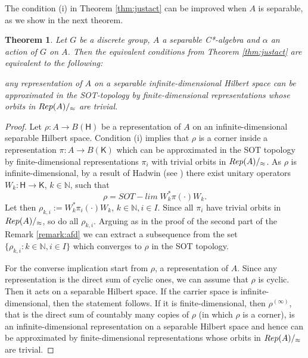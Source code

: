 \documentclass[11 pt, leqno, hidelinks]{amsart}%
\newtheorem{theorem}{Theorem}[section]
\theoremstyle{plain}
\numberwithin{equation}{section}
\newcommand{\N}{\mathbb{N}}
\newcommand{\Rep}{\textup{Rep}}
\newcommand{\Hil}{\mathsf{H}}
\newcommand{\Kil}{\mathsf{K}}
\begin{document}

The condition (i) in Theorem \ref{thm:justact} can be improved when $A$ is separable, as we show in the next theorem.

\begin{theorem}\label{thm:justactseparable}
	Let $G$ be a discrete  group, $A$ a separable C*-algebra and $\alpha$ an action of $G$ on $A$.  Then the equivalent conditions from Theorem \ref{thm:justact}  are equivalent to the following:

\medskip

 any  representation of $A$  on a separable infinite-dimensional Hilbert space can be approximated in the SOT-topology by finite-dimensional representations whose orbits in $\Rep(A)/_\approx$ are trivial.

\end{theorem}
\begin{proof}
		Let $\rho:A \to B(\Hil)$ be a representation of $A$ on an infinite-dimensional  separable Hilbert space. Condition (i)  implies that $\rho$ is a corner inside a representation $\pi:A \to B(\Kil)$ which can be approximated in the SOT topology by finite-dimensional representations $\pi_i$ with trivial orbits in $\Rep(A)/_\approx$.
	As $\rho$ is infinite-dimensional, by a result of Hadwin (see \cite[Lemma 2.4]{CS}) there exist unitary operators $W_k:\Hil \to \Kil$, $k \in \N$, such that
	$$\rho = SOT-lim \; W_k^*\pi (\cdot)W_k.$$
	Let then $\rho_{k,i}:=W_k^* \pi_i(\cdot) W_k$, $k \in \N, i \in I$. Since all $\pi_i$ have trivial orbits in $\Rep(A)/_\approx$, so do all $\rho_{k,i}$.
	Arguing as in the proof of the second part of the Remark \ref{remark:afd} we can extract a subsequence from the set $\{\rho_{k,i}: k \in \N, i \in I\}$ which converges to $\rho$ in the SOT topology.	
	
For the converse implication start from $\rho$, a representation of $A$. Since any representation is the direct sum of cyclic ones, we can assume that $\rho$ is cyclic. Then it acts on a separable Hilbert space. If the carrier space is infinite-dimensional, then the statement follows. If it is finite-dimensional, then $\rho^{(\infty)}$, that is  the direct sum of countably many copies of $\rho$ (in which $\rho$ is a corner), is an infinite-dimensional representation on a separable Hilbert space and hence can be approximated by finite-dimensional representations whose orbits in $\Rep(A)/_\approx$ are trivial.
\end{proof}
\end{document}
